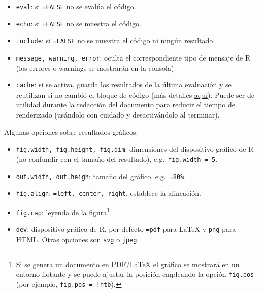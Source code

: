 \documentclass[
]{book}
\providecommand{\tightlist}{%
  \setlength{\itemsep}{0pt}\setlength{\parskip}{0pt}}
\theoremstyle{definition}
\theoremstyle{definition}
\theoremstyle{definition}
\theoremstyle{definition}
\theoremstyle{remark}
\begin{document}
\begin{itemize}
\tightlist
\item
  \texttt{eval}: si \texttt{=FALSE} no se evalúa el código.
\item
  \texttt{echo}: si \texttt{=FALSE} no se muestra el código.
\item
  \texttt{include}: si \texttt{=FALSE} no se muestra el código ni ningún resultado.
\item
  \texttt{message,\ warning,\ error}: oculta el correspondiente tipo de mensaje de R
  (los errores o warnings se mostrarán en la consola).
\item
  \texttt{cache}: si se activa, guarda los resultados de la última evaluación
  y se reutilizan si no cambió el bloque de código
  (más detalles \href{https://yihui.name/knitr/options/\#cache}{aquí}).
  Puede ser de utilidad durante la redacción del documento para reducir el tiempo de renderizado
  (usándolo con cuidado y desactivándolo al terminar).
\end{itemize}

Algunas opciones sobre resultados gráficos:

\begin{itemize}
\tightlist
\item
  \texttt{fig.width,\ fig.height,\ fig.dim}: dimensiones del dispositivo gráfico de R
  (no confundir con el tamaño del resultado), e.g.~\texttt{fig.width\ =\ 5}.
\item
  \texttt{out.width,\ out.heigh}: tamaño del gráfico, e.g.~\texttt{=\textquotesingle{}80\%\textquotesingle{}}.
\item
  \texttt{fig.align}: \texttt{=\textquotesingle{}left\textquotesingle{},\ \textquotesingle{}center\textquotesingle{},\ \textquotesingle{}right\textquotesingle{}}, establece la alineación.
\item
  \texttt{fig.cap}: leyenda de la figura\footnote{Si se genera un documento en PDF/LaTeX el gráfico
    se mostrará en un entorno flotante y se puede ajustar la posición empleando la opción
    \texttt{fig.pos} (por ejemplo, \texttt{fig.pos\ =\ \textquotesingle{}!htb\textquotesingle{}}).}.
\item
  \texttt{dev}: dispositivo gráfico de R, por defecto \texttt{=\textquotesingle{}pdf\textquotesingle{}} para LaTeX y \texttt{\textquotesingle{}png\textquotesingle{}} para HTML.
  Otras opciones son \texttt{\textquotesingle{}svg\textquotesingle{}} o \texttt{\textquotesingle{}jpeg\textquotesingle{}}.
\end{itemize}
\end{document}
